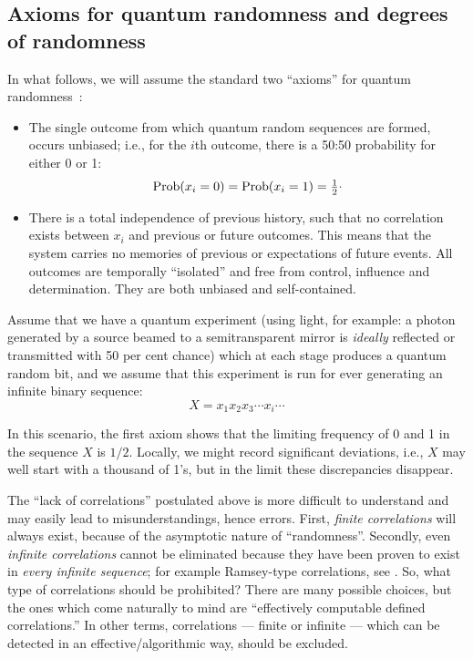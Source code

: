 \documentclass[pra,amsfonts,preprint,showkeys]{revtex4}
\begin{document}
\subsection{Axioms for quantum randomness and degrees of randomness}%
In what follows, we will assume the standard two ``axioms'' for
quantum randomness~\cite{jauch}:

\begin{itemize}
\item The single outcome
from which quantum random sequences are formed, occurs unbiased; i.e.,
for the $i$th outcome, there is a 50:50 probability for either 0 or 1:
\begin{equation}
\begin{array}{l}
\textrm{Prob}(x_i=0)
=
\textrm{Prob}(x_i=1)
={1\over 2}\raisebox{0.5ex}{.}
\end{array}
\end{equation}
\item   There is a total independence of previous history,
such that no correlation exists between $x_i$ and previous or future outcomes.
This means that the system carries no memories of previous or expectations of future events.
All outcomes are temporally ``isolated'' and
free from control, influence and determination.
They are both unbiased and self-contained.
\end{itemize}

Assume that we have a quantum experiment (using light, for example: a
photon generated by a source   beamed to a semitransparent mirror
is
{\it ideally}
reflected or transmitted with 50 per cent chance) which at each stage produces a quantum random bit, and we assume that this experiment is run for ever generating an infinite binary sequence:
\begin{equation}
\label{qrand}
X =x_1x_2x_3\cdots x_i \cdots
\end{equation}

In this scenario, the first axiom shows that the limiting frequency
of 0 and 1 in the sequence $X$ is $1/2$. Locally, we might record
significant deviations, i.e., $X$ may well start with a thousand of 1's, but in the limit these discrepancies disappear.

The ``lack of correlations''  postulated above is more difficult to understand and may easily lead to misunderstandings, hence errors.
First, {\it finite correlations} will always exist, because of the asymptotic nature of ``randomness''.
Secondly, even {\it infinite correlations} cannot be eliminated because they have been proven to exist in {\it every infinite sequence};  for example Ramsey-type correlations, see \cite{calude:02}. So, what type of correlations should be prohibited?
There are many possible choices, but the ones which come naturally to mind are ``effectively computable defined correlations.'' In other terms, correlations --- finite or infinite --- which can be detected in an effective/algorithmic way, should be excluded.
\end{document}

